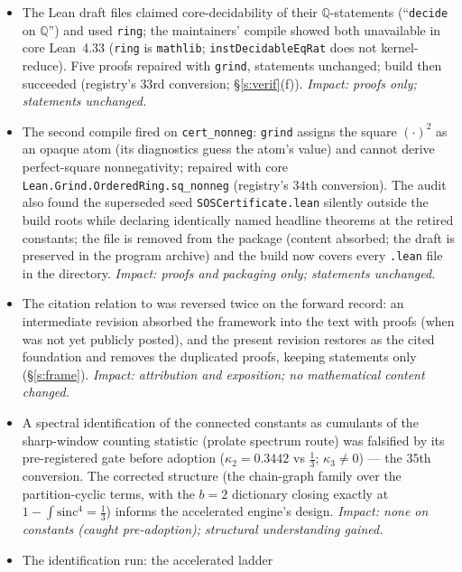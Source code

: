 \documentclass[11pt]{article}
\numberwithin{equation}{section}
\theoremstyle{definition}
\theoremstyle{remark}
\begin{document}
\begin{itemize}
independently forced by the same audit). \emph{Impact: direct
--- these are the constants the headline consumes; the theorem
value moved $0.7946\to0.7947$ under the correction.}
\item[D11.] The Lean draft files claimed
core-decidability of their $\mathbb Q$-statements
(``\texttt{decide} on $\mathbb Q$'') and used \texttt{ring};
the maintainers' compile showed both unavailable in core
Lean~4.33 (\texttt{ring} is \texttt{mathlib};
\texttt{instDecidableEqRat} does not kernel-reduce). Five
proofs repaired with \texttt{grind}, statements unchanged;
build then succeeded (registry's $33$rd conversion;
\S\ref{s:verif}(f)). \emph{Impact: proofs only; statements
unchanged.}
\item[D12.] The second compile fired on
\texttt{cert\_nonneg}: \texttt{grind} assigns the square
$(\cdot)^2$ as an opaque atom (its diagnostics guess the atom's
value) and cannot derive perfect-square nonnegativity; repaired
with core \texttt{Lean.Grind.OrderedRing.sq\_nonneg}
(registry's $34$th conversion). The audit also found the
superseded seed \texttt{SOSCertificate.lean} silently outside
the build roots while declaring identically named headline
theorems at the retired constants; the file is removed from the
package (content absorbed; the draft is preserved in the
program archive) and
the build now covers every \texttt{.lean} file in the
directory. \emph{Impact: proofs and packaging only; statements
unchanged.}
\item[D13.] The citation relation to \cite{C26} was reversed
twice on the forward record: an intermediate revision absorbed
the framework into the text with proofs (when \cite{C26} was
not yet publicly posted), and the present revision restores
\cite{C26} as the cited foundation and removes the duplicated
proofs, keeping statements only (\S\ref{s:frame}).
\emph{Impact: attribution and exposition; no mathematical
content changed.}
\item[D14.] A spectral identification of the connected
constants as cumulants of the sharp-window counting statistic
(prolate spectrum route) was falsified by its pre-registered
gate before adoption ($\kappa_2=0.3442$ vs $\tfrac13$;
$\kappa_3\ne0$) --- the $35$th conversion. The corrected
structure (the chain-graph family over the partition-cyclic
terms, with the $b=2$ dictionary closing exactly at
$1-\int\mathrm{sinc}^4=\tfrac13$) informs the accelerated
engine's design. \emph{Impact: none on constants (caught
pre-adoption); structural understanding gained.}
\item[D15.] The identification run: the accelerated ladder

\end{itemize}
\end{document}
